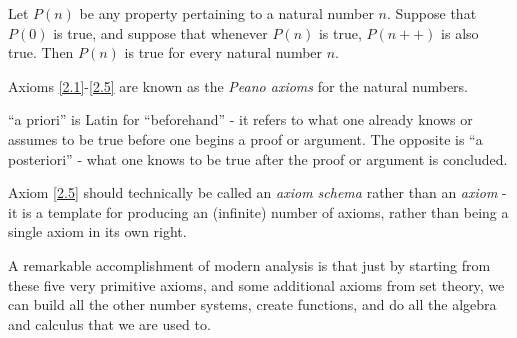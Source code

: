 \begin{axiom}\label{2.5}
Let \(P(n)\) be any property pertaining to a natural number \(n\).
Suppose that \(P(0)\) is true, and suppose that whenever \(P(n)\) is true, \(P(n++)\) is also true.
Then \(P(n)\) is true for every natural number \(n\).
\end{axiom}

\begin{note}
Axioms \ref{2.1}-\ref{2.5} are known as the \emph{Peano axioms} for the natural numbers.
\end{note}

\begin{note}
``a priori'' is Latin for ``beforehand''
- it refers to what one already knows or assumes to be true before one begins a proof or argument.
The opposite is ``a posteriori''
- what one knows to be true after the proof or argument is concluded.
\end{note}

\begin{note}
Axiom \ref{2.5} should technically be called an \emph{axiom schema} rather than an \emph{axiom}
- it is a template for producing an (infinite) number of axioms, rather than being a single axiom in its own right.
\end{note}

\begin{note}
A remarkable accomplishment of modern analysis is that just by starting from these five very primitive axioms, and some additional axioms from set theory, we can build all the other number systems, create functions, and do all the algebra and calculus that we are used to.
\end{note}
